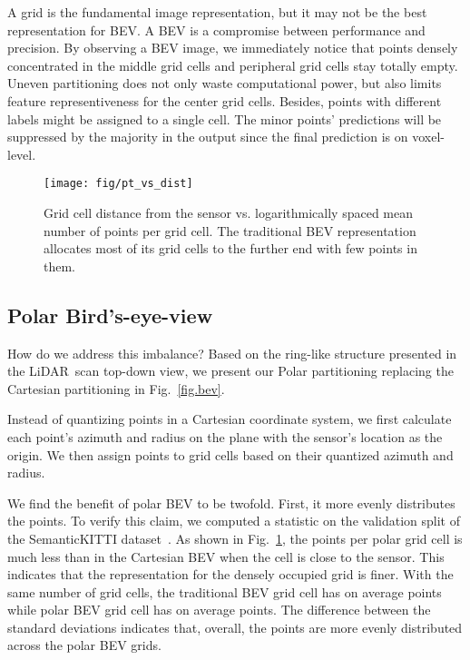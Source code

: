 \documentclass[10pt,twocolumn,letterpaper]{article}
\newcommand{\lidar}{\mbox{LiDAR }}
\begin{document}
A grid is the fundamental image representation, but it may not be the best representation for BEV. A BEV is a compromise between performance and precision. By observing a BEV image, we immediately notice that points densely concentrated in the middle grid cells and peripheral grid cells stay totally empty. Uneven partitioning does not only waste computational power, but also limits feature representiveness for the center grid cells. Besides, points with different labels might be assigned to a single cell. The minor points' predictions will be suppressed by the majority in the output since the final prediction is on voxel-level. 

\begin{figure}
  \centering
  \texttt{[image: fig/pt\_vs\_dist]}
  \vspace{-4pt}
  \caption{Grid cell distance from the sensor vs. logarithmically spaced mean number of points per grid cell. The traditional BEV representation allocates most of its grid cells to the further end with few points in them.}
  \label{fig:pt_vs_dist}
  \vspace{-15pt}
\end{figure}

\subsection{Polar Bird's-eye-view}

How do we address this imbalance? Based on the ring-like structure presented in the \lidar scan top-down view, we present our Polar partitioning replacing the Cartesian partitioning in Fig.~\ref{fig.bev}.

 Instead of quantizing points in a Cartesian coordinate system, we first calculate each point's azimuth and radius on the  plane with the sensor's location as the origin. We then assign points to grid cells based on their quantized azimuth and radius.
 
 We find the benefit of polar BEV to be twofold. First, it more evenly distributes the points. To verify this claim, we computed a statistic on the validation split of the SemanticKITTI dataset~\cite{behley2019iccv}. As shown in Fig.~\ref{fig:pt_vs_dist}, the points per polar grid cell is much less than in the Cartesian BEV when the cell is close to the sensor. This indicates that the representation for the densely occupied grid is finer.  With the same number of grid cells, the traditional BEV grid cell has on average  points while polar BEV grid cell has on average  points. The difference between the standard deviations indicates that, overall, the points are more evenly distributed across the polar BEV grids.
 
\end{document}
